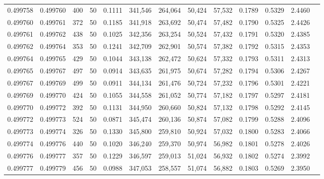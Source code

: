\begin{tabular}{rrrrrrrrrrrrr}
0.499758 & 0.499760 & 400 &  50 &                                     0.1111 & 341,546 & 264,064 &  50,424 &  57,532 & 0.1789 & 0.5329 & 2.4460 \\
0.499760 & 0.499761 & 372 &  50 &                                     0.1185 & 341,918 & 263,692 &  50,474 &  57,482 & 0.1790 & 0.5325 & 2.4426 \\
0.499761 & 0.499762 & 438 &  50 &                                     0.1025 & 342,356 & 263,254 &  50,524 &  57,432 & 0.1791 & 0.5320 & 2.4385 \\
0.499762 & 0.499764 & 353 &  50 &                                     0.1241 & 342,709 & 262,901 &  50,574 &  57,382 & 0.1792 & 0.5315 & 2.4353 \\
0.499764 & 0.499765 & 429 &  50 &                                     0.1044 & 343,138 & 262,472 &  50,624 &  57,332 & 0.1793 & 0.5311 & 2.4313 \\
0.499765 & 0.499767 & 497 &  50 &                                     0.0914 & 343,635 & 261,975 &  50,674 &  57,282 & 0.1794 & 0.5306 & 2.4267 \\
0.499767 & 0.499769 & 499 &  50 &                                     0.0911 & 344,134 & 261,476 &  50,724 &  57,232 & 0.1796 & 0.5301 & 2.4221 \\
0.499769 & 0.499770 & 424 &  50 &                                     0.1055 & 344,558 & 261,052 &  50,774 &  57,182 & 0.1797 & 0.5297 & 2.4181 \\
0.499770 & 0.499772 & 392 &  50 &                                     0.1131 & 344,950 & 260,660 &  50,824 &  57,132 & 0.1798 & 0.5292 & 2.4145 \\
0.499772 & 0.499773 & 524 &  50 &                                     0.0871 & 345,474 & 260,136 &  50,874 &  57,082 & 0.1799 & 0.5288 & 2.4096 \\
0.499773 & 0.499774 & 326 &  50 &                                     0.1330 & 345,800 & 259,810 &  50,924 &  57,032 & 0.1800 & 0.5283 & 2.4066 \\
0.499774 & 0.499776 & 440 &  50 &                                     0.1020 & 346,240 & 259,370 &  50,974 &  56,982 & 0.1801 & 0.5278 & 2.4026 \\
0.499776 & 0.499777 & 357 &  50 &                                     0.1229 & 346,597 & 259,013 &  51,024 &  56,932 & 0.1802 & 0.5274 & 2.3992 \\
0.499777 & 0.499779 & 456 &  50 &                                     0.0988 & 347,053 & 258,557 &  51,074 &  56,882 & 0.1803 & 0.5269 & 2.3950 \\

\end{tabular}
